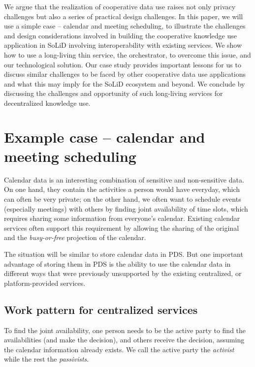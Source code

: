 \documentclass[
twocolumn,
]{ceurart}
\begin{document}
We argue that the realization of cooperative data use raises not only privacy challenges but also a series of practical design challenges. In this paper, we will use a simple case -- calendar and meeting scheduling, to illustrate the challenges and design considerations involved in building the cooperative knowledge use application in SoLiD involving interoperability with existing services.
We show how to use a long-living thin service, the orchestrator, to overcome this issue, and our technological solution. Our case study provides important lessons for us to discuss similar challenges to be faced by other cooperative data use applications and what this may imply for the SoLiD ecosystem and beyond. We conclude by discussing the challenges and opportunity of such long-living services for decentralized knowledge use.

\section{Example case -- calendar and meeting scheduling}

Calendar data is an interesting combination of sensitive and non-sensitive data. On one hand, they contain the activities a person would have everyday, which can often be very private; on the other hand, we often want to schedule events (especially meetings) with others by finding joint availability of time slots, which requires sharing some information from everyone's calendar. Existing calendar services often support this requirement by allowing the sharing of the original and the \emph{busy-or-free} projection of the calendar.

The situation will be similar to store calendar data in PDS. But one important advantage of storing them in PDS is the ability to use the calendar data in different ways that were previously unsupported by the existing centralized, or platform-provided services.

\subsection{Work pattern for centralized services}

To find the joint availability, one person needs to be the active party to find the availabilities (and make the decision), and others receive the decision, assuming the calendar information already exists. We call the active party the \emph{activist} while the rest the \emph{passivists}.
\end{document}
